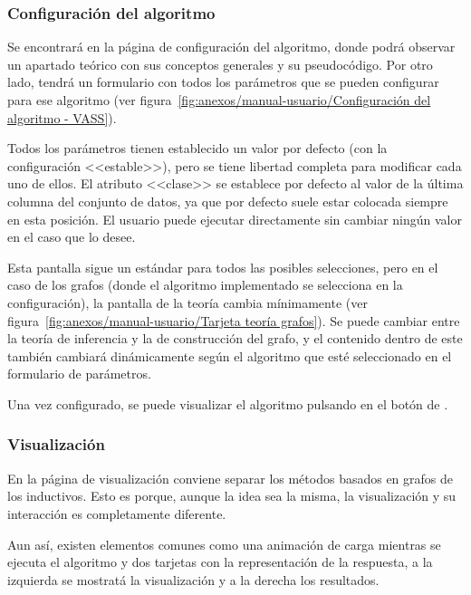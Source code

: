\subsubsection{Configuración del algoritmo}
\label{mu:configuracion}
Se encontrará en la página de configuración del algoritmo, donde podrá observar un apartado teórico con sus conceptos generales y su pseudocódigo. Por otro lado, tendrá un formulario con todos los parámetros que se pueden configurar para ese algoritmo (ver figura~\ref{fig:anexos/manual-usuario/Configuración del algoritmo - VASS}).


Todos los parámetros tienen establecido un valor por defecto (con la
configuración <<estable>>), pero se tiene libertad completa para modificar cada
uno de ellos. El atributo <<clase>> se establece por defecto al valor de la última columna del conjunto de datos, ya que por defecto suele estar colocada siempre en esta posición. El usuario puede ejecutar directamente sin cambiar ningún valor en el caso que lo desee.

Esta pantalla sigue un estándar para todos las posibles selecciones, pero en el caso de los grafos (donde el algoritmo implementado se selecciona en la configuración), la pantalla de la teoría cambia mínimamente (ver figura~\ref{fig:anexos/manual-usuario/Tarjeta teoría grafos}). Se puede cambiar entre la teoría de inferencia y la de construcción del grafo, y el contenido dentro de este también cambiará dinámicamente según el algoritmo que esté seleccionado en el formulario de parámetros.


Una vez configurado, se puede visualizar el algoritmo pulsando en el botón de
.

\subsubsection{Visualización}
\label{mu:visualizacion}
En la página de visualización conviene separar los métodos basados en grafos de los inductivos. Esto es porque, aunque la idea sea la misma, la visualización y su interacción es completamente diferente.

Aun así, existen elementos comunes como una animación de carga mientras se ejecuta el algoritmo y dos tarjetas con la representación de la respuesta, a la izquierda se mostratá la visualización y a la derecha los resultados.

